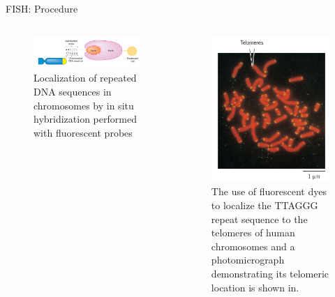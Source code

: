 \documentclass[ignorenonframetext,aspectratio=169]{beamer}
\begin{document}
\begin{frame}{FISH: Procedure}
\protect\hypertarget{fish-procedure}{}

\begin{columns}[T,onlytextwidth]

\begin{figure}
\includegraphics[width=0.65\linewidth]{./../images/fish_hybridization1} \caption{Localization of repeated DNA sequences in chromosomes by in situ hybridization performed with fluorescent probes}\label{fig:fish-hybridization1}
\end{figure}


\begin{figure}
\includegraphics[width=0.4\linewidth]{./../images/fish_hybridization2} \caption{The use of fluorescent dyes to localize the TTAGGG repeat sequence to the telomeres of human chromosomes and a photomicrograph demonstrating its telomeric location is shown in.}\label{fig:fish-hybridization2}
\end{figure}

\end{columns}

\end{frame}
\end{document}
